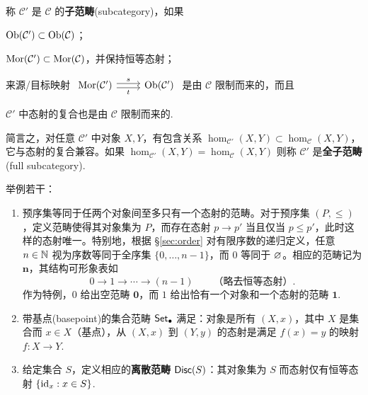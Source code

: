 \begin{definition}\label{def:subcategory}
	称 $\mathcal{C}'$ 是 $\mathcal{C}$ 的\textbf{子范畴}(subcategory)，如果
	\begin{compactenum}[(i)]
		\item $\operatorname{Ob}(\mathcal{C}') \subset \operatorname{Ob}(\mathcal{C})$；
		\item $\operatorname{Mor}(\mathcal{C}') \subset \operatorname{Mor}(\mathcal{C})$，并保持恒等态射；
		\item 来源/目标映射 $\begin{tikzcd} \Mor(\mathcal{C}') \arrow[yshift=-0.5ex, r, "t"'] \arrow[yshift=0.5ex, r, "s"] & \Obj(\mathcal{C}') \end{tikzcd}$ 是由 $\mathcal{C}$ 限制而来的，而且
		\item $\mathcal{C}'$ 中态射的复合也是由 $\mathcal{C}$ 限制而来的.
	\end{compactenum}
	简言之，对任意 $\mathcal{C}'$ 中对象 $X, Y$，有包含关系 $\hom_{\mathcal{C}'}(X, Y) \subset \hom_{\mathcal{C}}(X, Y)$，它与态射的复合兼容。如果 $\hom_{\mathcal{C}'}(X, Y) = \hom_{\mathcal{C}}(X, Y)$ 则称 $\mathcal{C}'$ 是\textbf{全子范畴}(full subcategory).
\end{definition}

\begin{example}\label{eg:categories}
	举例若干：
	\begin{enumerate}
		\item 预序集等同于任两个对象间至多只有一个态射的范畴。对于预序集 $(P, \leqslant)$，定义范畴使得其对象集为 $P$，而存在态射 $p \to p'$ 当且仅当 $p \leqslant p'$，此时这样的态射唯一。特别地，根据 \S\ref{sec:order} 对有限序数的递归定义，任意 $n \in \mathbb{N}$ 视为序数等同于全序集 $\{0, \ldots, n-1\}$，而 $0$ 等同于 $\varnothing$。相应的范畴记为 $\mathbf{n}$，其结构可形象表如
		\[ 0 \to 1 \to \cdots \to (n-1) \qquad \text{（略去恒等态射）}. \]
		作为特例，$0$ 给出空范畴 $\mathbf{0}$，而 $1$ 给出恰有一个对象和一个态射的范畴 $\mathbf{1}$.
		\item 带基点(basepoint)的集合范畴 $\mathsf{Set}_\bullet$ 满足：对象是所有 $(X, x)$，其中 $X$ 是集合而 $x \in X$（基点），从 $(X,x)$ 到 $(Y,y)$ 的态射是满足 $f(x)=y$ 的映射 $f: X \to Y$.
		\item 给定集合 $S$，定义相应的\textbf{离散范畴} $\mathsf{Disc}(S)$：其对象集为 $S$ 而态射仅有恒等态射 $\{ \mathrm{id}_x : x \in S \}$.
	\end{enumerate}
\end{example}

